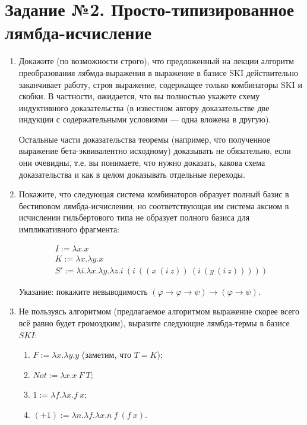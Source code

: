 \documentclass[10pt,a4paper,oneside]{article}
\begin{document}
\section*{Задание №2. Просто-типизированное лямбда-исчисление}

\begin{enumerate}
\item Докажите (по возможности строго), что предложенный на лекции алгоритм преобразования лябмда-выражения
в выражение в базисе SKI действительно заканчивает работу, строя выражение, содержащее только комбинаторы
SKI и скобки. В частности, ожидается, что вы полностью укажете схему индуктивного доказательства
(в известном автору доказательстве две индукции с содержательными условиями --- одна вложена в другую).

Остальные части доказательства теоремы (например, что полученное выражение 
бета-эквивалентно исходному) доказывать не обязательно, если они очевидны, т.е. вы понимаете,
что нужно доказать, какова схема доказательства и как в целом доказывать отдельные переходы.

\item Покажите, что следующая система комбинаторов образует полный базис в бестиповом
лямбда-исчислении, но соответствующая им система аксиом в исчислении гильбертового типа
не образует полного базиса для импликативного фрагмента:

$$\begin{array}{l}
I := \lambda x.x\\
K := \lambda x.\lambda y.x\\
S' := \lambda i.\lambda x.\lambda y.\lambda z.i\ (i\ ((x\ (i\ z))\ (i\ (y\ (i\ z)))))
\end{array}$$

Указание: покажите невыводимость $(\varphi \rightarrow \varphi \rightarrow \psi) \rightarrow (\varphi \rightarrow \psi)$.

\item Не пользуясь алгоритмом (предлагаемое алгоритмом выражение скорее всего всё равно будет громоздким), 
выразите следующие лямбда-термы в базисе $SKI$:
\begin{enumerate}
\item $F := \lambda x.\lambda y.y$ (заметим, что $T = K$);
\item $Not := \lambda x.x\ F\ T$;
\item $1 := \lambda f.\lambda x.f\ x$;
\item $(+1) := \lambda n.\lambda f.\lambda x.n\ f\ (f\ x)$.
\end{enumerate}


\end{enumerate}
\end{document}
